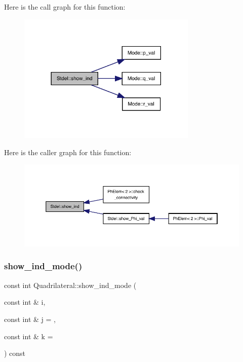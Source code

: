Here is the call graph for this function\+:
\nopagebreak
\begin{figure}[H]
\begin{center}
\leavevmode
\includegraphics[width=242pt]{classStdel_a20afd536025caf1aad1c4e3f41fcb866_cgraph}
\end{center}
\end{figure}
Here is the caller graph for this function\+:
\nopagebreak
\begin{figure}[H]
\begin{center}
\leavevmode
\includegraphics[width=350pt]{classStdel_a20afd536025caf1aad1c4e3f41fcb866_icgraph}
\end{center}
\end{figure}
\mbox{\label{classQuadrilateral_a346c5ac301c7ffad41ea7278fe45c45b}} 
\subsubsection{\texorpdfstring{show\+\_\+ind\+\_\+mode()}{show\_ind\_mode()}}
{\footnotesize\ttfamily const int Quadrilateral\+::show\+\_\+ind\+\_\+mode (\begin{DoxyParamCaption}\item[{const int \&}]{i,  }\item[{const int \&}]{j = {},  }\item[{const int \&}]{k = {} }\end{DoxyParamCaption}) const\hspace{0.3cm}{\ttfamily [virtual]}}



